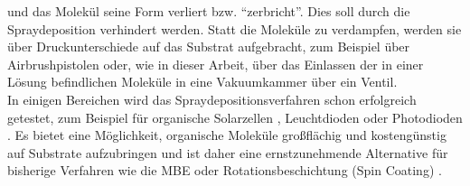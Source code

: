 und das Molekül seine Form verliert bzw. "`zerbricht"'. Dies soll durch die Spraydeposition
verhindert werden. Statt die Moleküle zu verdampfen, werden sie über Druckunterschiede auf das
Substrat aufgebracht, zum Beispiel über Airbrushpistolen oder, wie in dieser Arbeit, über das
Einlassen der in einer Lösung befindlichen Moleküle in eine Vakuumkammer über ein Ventil.
\\
In einigen Bereichen wird das Spraydepositionsverfahren schon erfolgreich getestet, zum Beispiel für
organische Solarzellen \cite{Tait}\cite{Hoth}, Leuchtdioden \cite{Wu} oder Photodioden \cite{Ted}.
Es bietet eine Möglichkeit, organische Moleküle großflächig und kostengünstig auf Substrate aufzubringen
\cite{Sun}\cite{Seok} und ist daher eine ernstzunehmende Alternative für bisherige Verfahren wie
die MBE oder Rotationsbeschichtung (Spin Coating) \cite{Alaa}.

